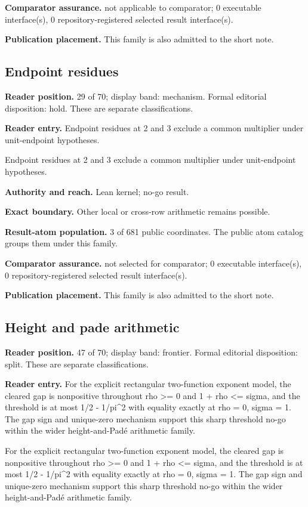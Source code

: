 \documentclass[11pt]{article}
\begin{document}
\textbf{Comparator assurance.} not applicable to comparator; 0 executable interface(s), 0 repository-registered selected result interface(s).

\textbf{Publication placement.} This family is also admitted to the short note.

\subsection{Endpoint residues}
\textbf{Reader position.} 29 of 70; display band: mechanism.  Formal editorial disposition: hold.  These are separate classifications.

\textbf{Reader entry.} Endpoint residues at 2 and 3 exclude a common multiplier under unit-endpoint hypotheses.

Endpoint residues at 2 and 3 exclude a common multiplier under unit-endpoint hypotheses.

\textbf{Authority and reach.} Lean kernel; no-go result.

\textbf{Exact boundary.} Other local or cross-row arithmetic remains possible.

\textbf{Result-atom population.} 3 of 681 public coordinates. The public atom catalog groups them under this family.

\textbf{Comparator assurance.} not selected for comparator; 0 executable interface(s), 0 repository-registered selected result interface(s).

\textbf{Publication placement.} This family is also admitted to the short note.

\subsection{Height and pade arithmetic}
\textbf{Reader position.} 47 of 70; display band: frontier.  Formal editorial disposition: split.  These are separate classifications.

\textbf{Reader entry.} For the explicit rectangular two-function exponent model, the cleared gap is nonpositive throughout rho >= 0 and 1 + rho <= sigma, and the threshold is at most 1/2 - 1/pi\textasciicircum{}2 with equality exactly at rho = 0, sigma = 1. The gap sign and unique-zero mechanism support this sharp threshold no-go within the wider height-and-Padé arithmetic family.

For the explicit rectangular two-function exponent model, the cleared gap is nonpositive throughout rho >= 0 and 1 + rho <= sigma, and the threshold is at most 1/2 - 1/pi\textasciicircum{}2 with equality exactly at rho = 0, sigma = 1. The gap sign and unique-zero mechanism support this sharp threshold no-go within the wider height-and-Padé arithmetic family.
\end{document}
